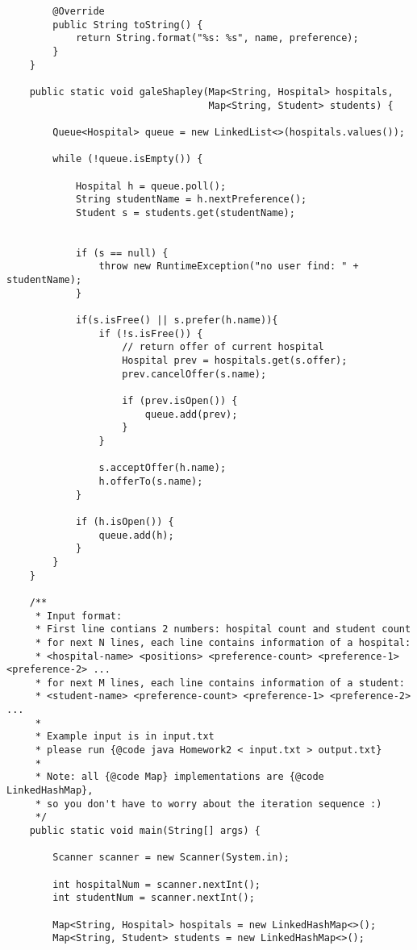 \documentclass[14pt, a4paper]{article}
\begin{document}
\begin{verbatim}
        @Override
        public String toString() {
            return String.format("%s: %s", name, preference);
        }
    }

    public static void galeShapley(Map<String, Hospital> hospitals,
                                   Map<String, Student> students) {

        Queue<Hospital> queue = new LinkedList<>(hospitals.values());

        while (!queue.isEmpty()) {

            Hospital h = queue.poll();
            String studentName = h.nextPreference();
            Student s = students.get(studentName);


            if (s == null) {
                throw new RuntimeException("no user find: " + studentName);
            }

            if(s.isFree() || s.prefer(h.name)){
                if (!s.isFree()) {
                    // return offer of current hospital
                    Hospital prev = hospitals.get(s.offer);
                    prev.cancelOffer(s.name);

                    if (prev.isOpen()) {
                        queue.add(prev);
                    }
                }

                s.acceptOffer(h.name);
                h.offerTo(s.name);
            }

            if (h.isOpen()) {
                queue.add(h);
            }
        }
    }

    /**
     * Input format:
     * First line contians 2 numbers: hospital count and student count
     * for next N lines, each line contains information of a hospital:
     * <hospital-name> <positions> <preference-count> <preference-1> <preference-2> ...
     * for next M lines, each line contains information of a student:
     * <student-name> <preference-count> <preference-1> <preference-2> ...
     * 
     * Example input is in input.txt
     * please run {@code java Homework2 < input.txt > output.txt} 
     *
     * Note: all {@code Map} implementations are {@code LinkedHashMap},
     * so you don't have to worry about the iteration sequence :)
     */
    public static void main(String[] args) {

        Scanner scanner = new Scanner(System.in);

        int hospitalNum = scanner.nextInt();
        int studentNum = scanner.nextInt();

        Map<String, Hospital> hospitals = new LinkedHashMap<>();
        Map<String, Student> students = new LinkedHashMap<>();


\end{verbatim}
\end{document}
